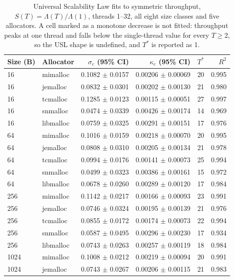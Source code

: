 \begin{table}[!htbp]
\centering
\scriptsize
\setlength{\tabcolsep}{3pt}
\caption{Universal Scalability Law fits to symmetric throughput, $S(T)=\Lambda(T)/\Lambda(1)$, threads 1--32, all eight size classes and five allocators. A cell marked as a monotone decrease is not fitted: throughput peaks at one thread and falls below the single-thread value for every $T \ge 2$, so the USL shape is undefined, and $T^*$ is reported as 1.}
\label{tab:usl-all}
\begin{tabular}{llrrrr}
\toprule
Size (B) & Allocator & $\sigma_c$ (95\% CI) & $\kappa_c$ (95\% CI) & $T^*$ & $R^2$\\
\midrule
16 & mimalloc & 0.1082 $\pm$ 0.0157 & 0.00206 $\pm$ 0.00069 & 20 & 0.995 \\
16 & jemalloc & 0.0832 $\pm$ 0.0301 & 0.00202 $\pm$ 0.00130 & 21 & 0.980 \\
16 & tcmalloc & 0.1285 $\pm$ 0.0123 & 0.00115 $\pm$ 0.00051 & 27 & 0.997 \\
16 & snmalloc & 0.0474 $\pm$ 0.0339 & 0.00426 $\pm$ 0.00174 & 14 & 0.969 \\
16 & libmalloc & 0.0759 $\pm$ 0.0325 & 0.00291 $\pm$ 0.00151 & 17 & 0.976 \\
64 & mimalloc & 0.1016 $\pm$ 0.0159 & 0.00218 $\pm$ 0.00070 & 20 & 0.995 \\
64 & jemalloc & 0.0808 $\pm$ 0.0310 & 0.00205 $\pm$ 0.00134 & 21 & 0.978 \\
64 & tcmalloc & 0.0994 $\pm$ 0.0176 & 0.00141 $\pm$ 0.00073 & 25 & 0.994 \\
64 & snmalloc & 0.0499 $\pm$ 0.0323 & 0.00386 $\pm$ 0.00161 & 15 & 0.972 \\
64 & libmalloc & 0.0678 $\pm$ 0.0260 & 0.00289 $\pm$ 0.00120 & 17 & 0.984 \\
256 & mimalloc & 0.1142 $\pm$ 0.0217 & 0.00166 $\pm$ 0.00093 & 23 & 0.991 \\
256 & jemalloc & 0.0746 $\pm$ 0.0324 & 0.00195 $\pm$ 0.00139 & 21 & 0.976 \\
256 & tcmalloc & 0.0855 $\pm$ 0.0172 & 0.00174 $\pm$ 0.00073 & 22 & 0.994 \\
256 & snmalloc & 0.0587 $\pm$ 0.0495 & 0.00296 $\pm$ 0.00230 & 17 & 0.934 \\
256 & libmalloc & 0.0743 $\pm$ 0.0263 & 0.00257 $\pm$ 0.00119 & 18 & 0.984 \\
1024 & mimalloc & 0.1008 $\pm$ 0.0212 & 0.00219 $\pm$ 0.00094 & 20 & 0.991 \\
1024 & jemalloc & 0.0743 $\pm$ 0.0267 & 0.00206 $\pm$ 0.00115 & 21 & 0.983 \\

\end{tabular}
\end{table}
